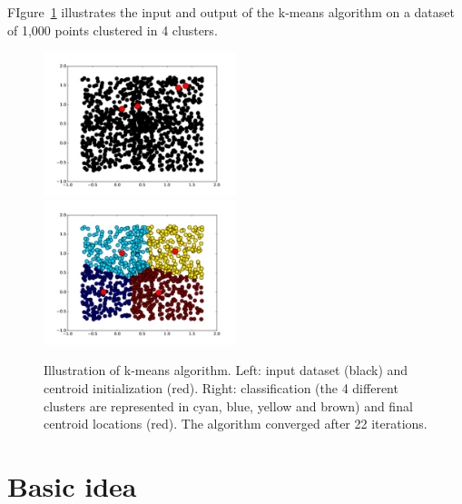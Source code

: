 \documentclass[11pt]{article}
\begin{document}
FIgure~\ref{fig:illustration} illustrates the input and output of the
k-means algorithm on a dataset of 1,000 points clustered in 4 clusters.
\begin{figure}[h]
  \includegraphics[width=0.5\textwidth]{kmeans/initialisation.pdf}
  \includegraphics[width=0.5\textwidth]{kmeans/converged.pdf}
  \label{fig:illustration}
  \caption{Illustration of k-means algorithm. Left: input dataset
    (black) and centroid initialization (red). Right: classification
    (the 4 different clusters are represented in cyan, blue, yellow and brown) and
    final centroid locations (red). The algorithm converged after 22 iterations.}
\end{figure}

\section{Basic idea}
\end{document}
